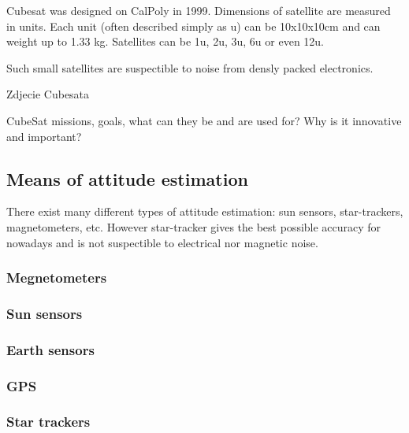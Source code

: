 \documentclass[12pt,a4paper,oneside]{article}
\begin{document}

Cubesat was designed on CalPoly in 1999\cite{heidt2000cubesat}.
Dimensions of satellite are measured in units. Each unit (often described simply as u) can be 10x10x10cm and can weight up to 1.33 kg. Satellites can be 1u, 2u, 3u, 6u or even 12u.

Such small satellites are suspectible to noise from densly packed electronics.

Zdjecie Cubesata

CubeSat missions, goals, what can they be and are used for? Why is it innovative and important?

\subsection{Means of attitude estimation}

There exist many different types of attitude estimation: sun sensors, star-trackers, magnetometers, etc. However star-tracker gives the best possible accuracy for nowadays and is not suspectible to electrical nor magnetic noise.

\subsubsection{Megnetometers}
\subsubsection{Sun sensors}
\subsubsection{Earth sensors}
\subsubsection{GPS}
\subsubsection{Star trackers}
\end{document}
